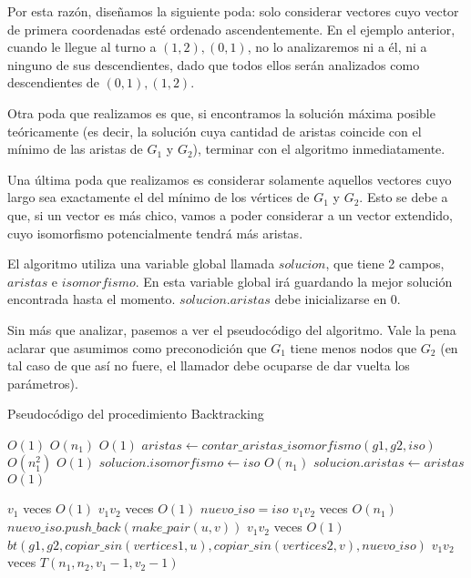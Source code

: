 Por esta razón, diseñamos la siguiente poda: solo considerar vectores cuyo vector de primera coordenadas esté ordenado ascendentemente. En el ejemplo anterior, cuando le llegue al turno a ${(1,2), (0,1)}$, no lo analizaremos ni a él, ni a ninguno de sus descendientes, dado que todos ellos serán analizados como descendientes de ${(0,1), (1,2)}$.

Otra poda que realizamos es que, si encontramos la solución máxima posible teóricamente (es decir, la solución cuya cantidad de aristas coincide con el mínimo de las aristas de $G_1$ y $G_2$), terminar con el algoritmo inmediatamente.

Una última poda que realizamos es considerar solamente aquellos vectores cuyo largo sea exactamente el del mínimo de los vértices de $G_1$ y $G_2$. Esto se debe a que, si un vector es más chico, vamos a poder considerar a un vector extendido, cuyo isomorfismo potencialmente tendrá más aristas.

El algoritmo utiliza una variable global llamada $solucion$, que tiene 2 campos, $aristas$ e $isomorfismo$. En esta variable global irá guardando la mejor solución encontrada hasta el momento. $solucion.aristas$ debe inicializarse en 0.

Sin más que analizar, pasemos a ver el pseudocódigo del algoritmo. Vale la pena aclarar que asumimos como preconodición que $G_1$ tiene menos nodos que $G_2$ (en tal caso de que así no fuere, el llamador debe ocuparse de dar vuelta los parámetros).


\begin{algorithm}[H]
  \begin{algorithmic}[1]
  \caption{Pseudocódigo del procedimiento Backtracking}
  \label{algo:2-1}
        \Comment $O(1)$ 
        \State \Return
      \EndIf
        \Comment $O(n_1)$ 
        \State \Return
      \EndIf
        \Comment $O(1)$ 
        \State $aristas \gets contar\_aristas\_isomorfismo(g1, g2, iso)$
        \Comment $O(n_1^2)$ 
          \Comment $O(1)$ 
          \State $solucion.isomorfismo \gets iso$
          \Comment $O(n_1)$ 
          \State $solucion.aristas \gets aristas$
          \Comment $O(1)$ 
        \EndIf
        \State \Return
      \EndIf
      
        \Comment $v_1$ veces $O(1)$ 
          \Comment $v_1 v_2$ veces $O(1)$ 
          \State $nuevo\_iso = iso$
          \Comment $v_1 v_2$ veces $O(n_1)$ 
          \State $nuevo\_iso.push\_back(make\_pair(u,v))$
          \Comment $v_1 v_2$ veces $O(1)$ 
          \State $bt(g1, g2, copiar\_sin(vertices1, u), copiar\_sin(vertices2, v), nuevo\_iso)$
          \Comment $v_1 v_2$ veces $T(n_1, n_2, v_1 - 1, v_2 - 1)$
        \EndFor
      \EndFor
		\EndProcedure
	\end{algorithmic}
\end{algorithm}



